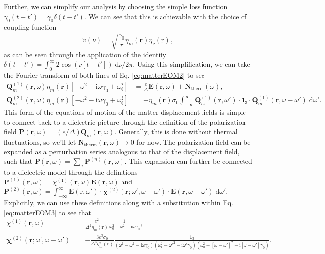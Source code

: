 Further, we can simplify our analysis by choosing the simple loss function $\gamma_0(t - t') = \gamma_0\delta(t - t')$. We can see that this is achievable with the choice of coupling function
\begin{equation}
\tilde{v}(\nu) = \sqrt{\frac{\gamma_0}{\pi}\eta_m(\mathbf{r})\eta_\nu(\mathbf{r})},
\end{equation}
as can be seen through the application of the identity $\delta(t - t') = \int_0^\infty 2\cos(\nu[t - t'])\;\mathrm{d}\nu/2\pi$. Using this simplification, we can take the Fourier transform of both lines of Eq. \eqref{eq:matterEOM2} to see
\begin{equation}\label{eq:matterEOM3}
\begin{split}
\mathbf{Q}_m^{(1)}(\mathbf{r},\omega)\eta_m(\mathbf{r})\left[-\omega^2 - \mathrm{i}\omega\gamma_0 + \omega_0^2\right] &= \frac{e}{\Delta}\mathbf{E}(\mathbf{r},\omega) + \mathbf{N}_\mathrm{therm}(\omega),\\
\mathbf{Q}_m^{(2)}(\mathbf{r},\omega)\eta_m(\mathbf{r})\left[-\omega^2 - \mathrm{i}\omega\gamma_0 + \omega_0^2\right] &= -\eta_m(\mathbf{r})\sigma_0\int_{-\infty}^\infty\mathbf{Q}_m^{(1)}(\mathbf{r},\omega')\cdot\bm{1}_3\cdot\mathbf{Q}_m^{(1)}(\mathbf{r},\omega - \omega')\;\mathrm{d}\omega'.
\end{split}
\end{equation}
This form of the equations of motion of the matter displacement fields is simple to connect back to a dielectric picture through the definition of the polarization field $\mathbf{P}(\mathbf{r},\omega) = (e/\Delta)\mathbf{Q}_m(\mathbf{r},\omega)$. Generally, this is done without thermal fluctuations, so we'll let $\mathbf{N}_\mathrm{therm}(\mathbf{r},\omega)\to0$ for now. The polarization field can be expanded as a perturbation series analogous to that of the displacement field, such that $\mathbf{P}(\mathbf{r},\omega) = \sum_n\mathbf{P}^{(n)}(\mathbf{r},\omega)$. This expansion can further be connected to a dielectric model through the definitions $\mathbf{P}^{(1)}(\mathbf{r},\omega) = \chi^{(1)}(\mathbf{r},\omega)\mathbf{E}(\mathbf{r},\omega)$ and $\mathbf{P}^{(2)}(\mathbf{r},\omega) = \int_{-\infty}^\infty\mathbf{E}(\mathbf{r},\omega')\cdot\bm{\chi}^{(2)}(\mathbf{r};\omega',\omega - \omega')\cdot\mathbf{E}(\mathbf{r},\omega - \omega')\;\mathrm{d}\omega'$. Explicitly, we can use these definitions along with a substitution within Eq. \eqref{eq:matterEOM3} to see that
\begin{equation}
\begin{split}
\chi^{(1)}(\mathbf{r},\omega) &= \frac{e^2}{\Delta^2\eta_m(\mathbf{r})}\frac{1}{\omega_0^2 - \omega^2 - \mathrm{i}\omega\gamma_0},\\
\bm{\chi}^{(2)}(\mathbf{r};\omega',\omega - \omega') &= -\frac{3e^3\sigma_0}{\Delta^3\eta_m^2(\mathbf{r})}\frac{\bm{1}_3}{(\omega_0^2 - \omega^2 - \mathrm{i}\omega\gamma_0)(\omega_0^2 - \omega'^2 - \mathrm{i}\omega'\gamma_0)(\omega_0^2 - [\omega - \omega']^2 - \mathrm{i}[\omega - \omega']\gamma_0)}.
\end{split}
\end{equation}

